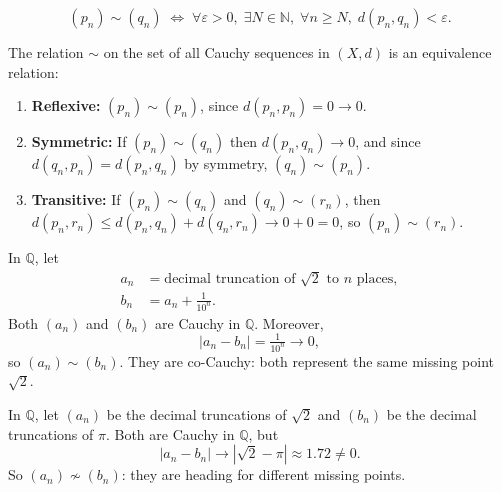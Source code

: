 \begin{remark*}
\[
(p_n) \sim (q_n)
\;\iff\;
\forall \varepsilon > 0,\; \exists N \in \mathbb{N},\; \forall n \ge N,\; d(p_n, q_n) < \varepsilon.
\]
\end{remark*}

\begin{proposition}
\label{prop:co-cauchy-equivalence-relation}
The relation $\sim$ on the set of all Cauchy sequences in $(X,d)$ is an equivalence relation:
\begin{enumerate}[label=(\roman*)]
  \item \textbf{Reflexive:} $(p_n) \sim (p_n)$, since $d(p_n, p_n) = 0 \to 0$.
  \item \textbf{Symmetric:} If $(p_n) \sim (q_n)$ then $d(p_n, q_n) \to 0$, and since
        $d(q_n, p_n) = d(p_n, q_n)$ by symmetry, $(q_n) \sim (p_n)$.
  \item \textbf{Transitive:} If $(p_n) \sim (q_n)$ and $(q_n) \sim (r_n)$, then
        $d(p_n, r_n) \le d(p_n, q_n) + d(q_n, r_n) \to 0 + 0 = 0$, so $(p_n) \sim (r_n)$.
\end{enumerate}
\end{proposition}

\begin{example}
\label{ex:co-cauchy-sqrt2}
In $\mathbb{Q}$, let
\begin{align*}
a_n &= \text{decimal truncation of } \sqrt{2} \text{ to } n \text{ places}, \\
b_n &= a_n + \tfrac{1}{10^n}.
\end{align*}
Both $(a_n)$ and $(b_n)$ are Cauchy in $\mathbb{Q}$.
Moreover,
\[
|a_n - b_n| = \tfrac{1}{10^n} \to 0,
\]
so $(a_n) \sim (b_n)$.
They are co-Cauchy: both represent the same missing point $\sqrt{2}$.
\end{example}

\begin{example}
\label{ex:not-co-cauchy}
In $\mathbb{Q}$, let $(a_n)$ be the decimal truncations of $\sqrt{2}$
and $(b_n)$ be the decimal truncations of $\pi$.
Both are Cauchy in $\mathbb{Q}$, but
\[
|a_n - b_n| \to |\sqrt{2} - \pi| \approx 1.72 \neq 0.
\]
So $(a_n) \not\sim (b_n)$: they are heading for different missing points.
\end{example}

